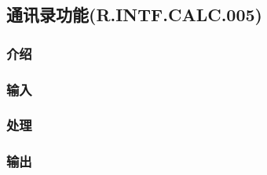 \subsection{通讯录功能(R.INTF.CALC.005)}
\subsubsection{介绍}
\subsubsection{输入}
\subsubsection{处理}
\subsubsection{输出}
